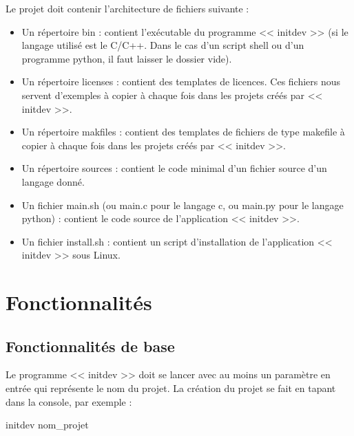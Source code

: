 \documentclass[10pt,a4paper]{article}
\begin{document}
Le projet doit contenir l'architecture de fichiers suivante : 
\begin{itemize}
  \item Un répertoire bin : contient l'exécutable du programme << initdev >> (si le langage utilisé est le C/C++. Dans le cas d'un script shell ou d'un programme python, il faut laisser le dossier vide).
  \item Un répertoire licenses : contient des templates de licences. Ces fichiers nous servent d'exemples à copier à chaque fois dans les projets créés par << initdev >>.
  \item Un répertoire makfiles : contient des templates de fichiers de type makefile à copier à chaque fois dans les projets créés par << initdev >>. 
  \item Un répertoire sources : contient le code minimal d'un fichier source d'un langage donné. 
  \item Un fichier main.sh (ou main.c pour le langage c, ou main.py pour le langage python) : contient le code source de l'application << initdev >>. 
  \item Un fichier install.sh : contient un script d'installation de l'application << initdev >> sous Linux.
\end{itemize}


\section{Fonctionnalités}
\label{sec:fct}
\subsection{Fonctionnalités de base}
Le programme << initdev >> doit se lancer avec au moins un paramètre en entrée qui représente le nom du projet. La création du projet se fait en tapant dans la console, par exemple : 
  \begin{center}
    initdev nom\_projet
  \end{center}
  
\end{document}
